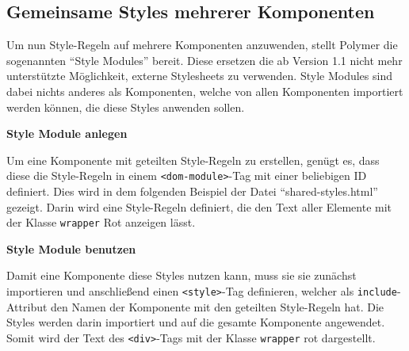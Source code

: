 \subsection{Gemeinsame Styles mehrerer Komponenten}\label{gemeinsame-styles-mehrerer-komponenten}

Um nun Style-Regeln auf mehrere Komponenten anzuwenden, stellt Polymer die sogenannten ``Style Modules'' bereit. Diese ersetzen die ab Version 1.1 nicht mehr unterstützte Möglichkeit, externe Stylesheets zu verwenden. Style Modules sind dabei nichts anderes als Komponenten, welche von allen Komponenten importiert werden können, die diese Styles anwenden sollen.


\textbf{Style Module anlegen}

Um eine Komponente mit geteilten Style-Regeln zu erstellen, genügt es, dass diese die Style-Regeln in einem \texttt{\textless{}dom-module\textgreater{}}-Tag mit einer beliebigen ID definiert. Dies wird in dem folgenden Beispiel der Datei ``shared-styles.html'' gezeigt. Darin wird eine Style-Regeln definiert, die den Text aller Elemente mit der Klasse \texttt{wrapper} Rot anzeigen lässt.

\begin{Shaded}
\begin{Highlighting}[]
\KeywordTok{>}
       \KeywordTok{\{}  \KeywordTok{;} \KeywordTok{\}}
\end{Highlighting}
\end{Shaded}


\textbf{Style Module benutzen}

Damit eine Komponente diese Styles nutzen kann, muss sie sie zunächst importieren und anschließend einen \texttt{\textless{}style\textgreater{}}-Tag definieren, welcher als \texttt{include}-Attribut den Namen der Komponente mit den geteilten Style-Regeln hat. Die Styles werden darin importiert und auf die gesamte Komponente angewendet. Somit wird der Text des \texttt{\textless{}div\textgreater{}}-Tags mit der Klasse \texttt{wrapper} rot dargestellt.

\begin{Shaded}
\begin{Highlighting}[]
\KeywordTok{>}
\KeywordTok{>}
    \KeywordTok{>}
  \NormalTok{(}\OperatorTok{\{}\OperatorTok{:} \OperatorTok{\}}\NormalTok{)}\OperatorTok{;<}
\OperatorTok{-}\OperatorTok{>}
\end{Highlighting}
\end{Shaded}


